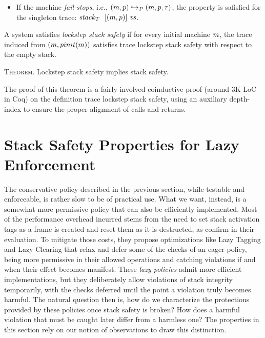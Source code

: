 \documentclass[acmsmall,review,anonymous]{acmart}\settopmatter{printfolios=true,printccs=false,printacmref=false}
\begin{document}
\begin{itemize}
\item If the machine \emph{fail-stops}, i.e., $(m, p) \hookrightarrow_P
    (m, p, \tau)$, the property is safisfied for the singleton trace:
    $\mathit{stack}_T ~  ~ [(m, p)] ~ \mathit{vs}$.


  \end{itemize}

%
A system satisfies {\em lockstep stack safety} if for every initial machine $m$,
the trace induced from $(m, pinit(m))$ satisfies trace lockstep stack safety with
respect to the empty stack.

\medskip
\textsc{Theorem.}
Lockstep stack safety implies stack safety.
\smallskip

The proof of this theorem is a fairly involved coinductive proof
(around 3K LoC in Coq) on the definition trace lockstep stack safety,
using an auxiliary depth-index to ensure the proper aligmnent of
calls and returns.

\section{Stack Safety Properties for Lazy Enforcement}
\label{sec:lazy}

The conservative policy described in the previous section, while
testable and enforceable, is rather slow to be of practical use. What
we want, instead, is a somewhat more permissive policy that can also
be efficiently implemented. Most of the performance overhead incurred
stems from the need to set stack activation tags as a frame is created
and reset them as it is destructed, as
\citet{DBLP:conf/sp/RoesslerD18} confirm in their evaluation. To
mitigate those costs, they propose optimizations like Lazy Tagging and
Lazy Clearing that relax and defer some of the checks of an eager
policy, being more permissive in their allowed operations and catching
violations if and when their effect becomes manifest.
%
These \emph{lazy policies} admit more efficient implementations, but
they deliberately allow violations of stack integrity temporarily,
with the checks deferred until the point a violation truly becomes
harmful. The natural question then is, how do we characterize the
protections provided by these policies once stack safety is broken?
How does a harmful violation that must be caught later differ from a
harmless one? The properties in this section rely on our notion of
observations to draw this distinction.
\end{document}

